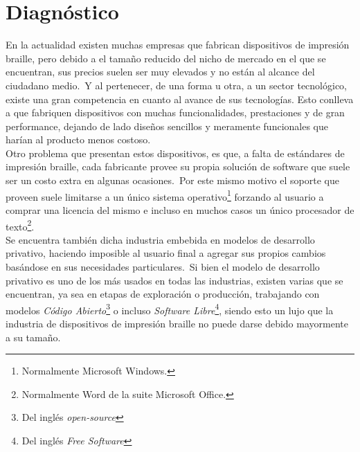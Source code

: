 \chapter{Diagn\'ostico}




En la actualidad existen muchas empresas que fabrican dispositivos de
impresi\'on braille, pero debido a el tama\~no reducido del nicho de mercado
en el que se encuentran, sus precios suelen ser muy elevados y no est\'an al
alcance del ciudadano medio.\ Y al pertenecer, de una forma u otra, a un sector
tecnol\'ogico, existe una gran competencia en cuanto al avance de sus
tecnolog\'ias. Esto conlleva a que fabriquen dispositivos con muchas
funcionalidades, prestaciones y de gran performance, dejando de lado dise\~nos
sencillos y meramente funcionales que har\'ian al producto menos costoso.\\

Otro problema que presentan estos dispositivos, es que, a falta de est\'andares
de impresi\'on braille, cada fabricante provee su propia soluci\'on de
software que suele ser un costo extra en algunas ocasiones.\ 
Por este mismo motivo el soporte que proveen suele limitarse a un \'unico
sistema operativo\footnote{Normalmente Microsoft Windows.} forzando al usuario
a comprar una licencia del mismo e incluso en muchos casos un \'unico
procesador de texto\footnote{Normalmente Word de la suite Microsoft Office.}.\\

Se encuentra tambi\'en dicha industria embebida en modelos de desarrollo
privativo, haciendo imposible al usuario final a agregar sus propios cambios
bas\'andose en sus necesidades particulares.\ Si bien el modelo de desarrollo
privativo es uno de los m\'as usados en todas las industrias, existen varias
que
se encuentran, ya sea en etapas de exploraci\'on o producci\'on, trabajando con
modelos \emph{C\'odigo Abierto}\footnote{Del ingl\'es \emph{open-source}} o
incluso \emph{Software Libre}\footnote{Del ingl\'es \emph{ Free Software}},
siendo esto un lujo que la industria de dispositivos de impresi\'on braille no
puede darse debido mayormente a su tama\~no.\\

